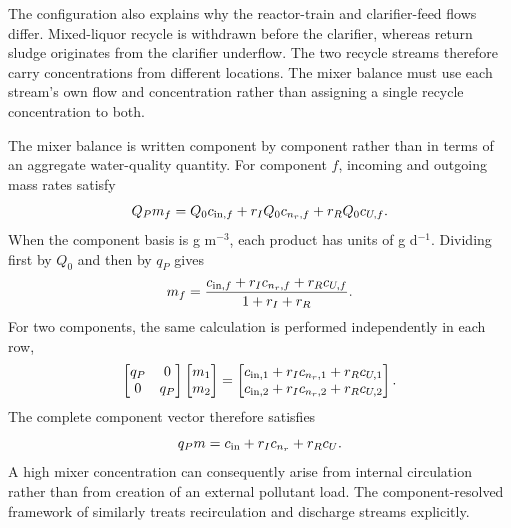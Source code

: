 The configuration also explains why the reactor-train and clarifier-feed flows differ. Mixed-liquor recycle is withdrawn before the clarifier, whereas return sludge originates from the clarifier underflow. The two recycle streams therefore carry concentrations from different locations. The mixer balance must use each stream's own flow and concentration rather than assigning a single recycle concentration to both.

The mixer balance is written component by component rather than in terms of an aggregate water-quality quantity. For component $f$, incoming and outgoing mass rates satisfy
\begin{equation}
\equationname{Scalar mixer equation for one component}
Q_Pm_f=Q_0c_{{\rm in},f}+r_IQ_0c_{n_r,f}+r_RQ_0c_{U,f}.
\end{equation}
When the component basis is g m$^{-3}$, each product has units of g d$^{-1}$. Dividing first by $Q_0$ and then by $q_P$ gives
\begin{equation}
\equationname{Mixer concentration as a flow-weighted component average}
m_f=\frac{c_{{\rm in},f}+r_Ic_{n_r,f}+r_Rc_{U,f}}{1+r_I+r_R}.
\end{equation}
For two components, the same calculation is performed independently in each row,
\begin{equation}
\equationname{Illustrative two-component mixer matrix equation}
\begin{bmatrix}q_P&0\\0&q_P\end{bmatrix}
\begin{bmatrix}m_1\\m_2\end{bmatrix}
=\begin{bmatrix}c_{{\rm in},1}+r_Ic_{n_r,1}+r_Rc_{U,1}\\
c_{{\rm in},2}+r_Ic_{n_r,2}+r_Rc_{U,2}\end{bmatrix}.
\end{equation}
The complete component vector therefore satisfies
\begin{equation}
\equationname{Vector mixer equation for the complete component state}
q_Pm=c_{\rm in}+r_Ic_{n_r}+r_Rc_U.
\label{eq:plant_mixer}
\end{equation}
A high mixer concentration can consequently arise from internal circulation rather than from creation of an external pollutant load. The component-resolved framework of \citet{Zhang2026} similarly treats recirculation and discharge streams explicitly.

